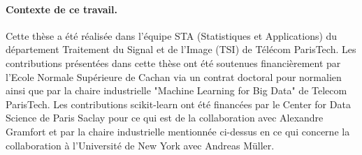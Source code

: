 \documentclass[a4paper, 12pt]{article}
\begin{document}


\paragraph{Contexte de ce travail.}
Cette thèse a été réalisée dans l'équipe STA (Statistiques et Applications) du département Traitement du Signal et de l'Image (TSI) de Télécom ParisTech. Les contributions présentées dans cette thèse ont été soutenues financièrement par l'Ecole Normale Supérieure de Cachan via un contrat doctoral pour normalien ainsi que par la chaire industrielle "Machine Learning for Big Data" de Telecom ParisTech. Les contributions scikit-learn ont été financées par le Center for Data Science de Paris Saclay pour ce qui est de la collaboration avec Alexandre Gramfort et par la chaire industrielle mentionnée ci-dessus en ce qui concerne la collaboration à l'Université de New York avec Andreas Müller.




\end{document}
